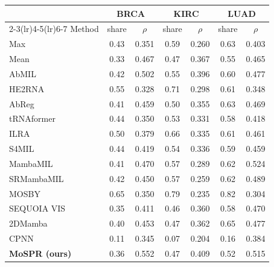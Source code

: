 \begin{tabular}{lcccccc}
\toprule
& \multicolumn{2}{c}{BRCA} & \multicolumn{2}{c}{KIRC} & \multicolumn{2}{c}{LUAD}\\
\cmidrule(lr){2-3}\cmidrule(lr){4-5}\cmidrule(lr){6-7}
Method & share & $\rho$ & share & $\rho$ & share & $\rho$\\
\midrule
Max & 0.43 & 0.351 & 0.59 & 0.260 & 0.63 & 0.403\\
Mean & 0.33 & 0.467 & 0.47 & 0.367 & 0.55 & 0.465\\
AbMIL & 0.42 & 0.502 & 0.55 & 0.396 & 0.60 & 0.477\\
HE2RNA & 0.55 & 0.328 & 0.71 & 0.298 & 0.61 & 0.348\\
AbReg & 0.41 & 0.459 & 0.50 & 0.355 & 0.63 & 0.469\\
tRNAformer & 0.44 & 0.350 & 0.53 & 0.331 & 0.58 & 0.418\\
ILRA & 0.50 & 0.379 & 0.66 & 0.335 & 0.61 & 0.461\\
S4MIL & 0.44 & 0.419 & 0.54 & 0.336 & 0.59 & 0.459\\
MambaMIL & 0.41 & 0.470 & 0.57 & 0.289 & 0.62 & 0.524\\
SRMambaMIL & 0.42 & 0.450 & 0.57 & 0.259 & 0.62 & 0.489\\
MOSBY & 0.65 & 0.350 & 0.79 & 0.235 & 0.82 & 0.304\\
SEQUOIA VIS & 0.35 & 0.411 & 0.46 & 0.360 & 0.58 & 0.470\\
2DMamba & 0.40 & 0.453 & 0.47 & 0.362 & 0.65 & 0.477\\
CPNN & 0.11 & 0.345 & 0.07 & 0.204 & 0.16 & 0.384\\
\textbf{MoSPR (ours)} & 0.36 & 0.552 & 0.47 & 0.409 & 0.52 & 0.515\\
\bottomrule
\end{tabular}
